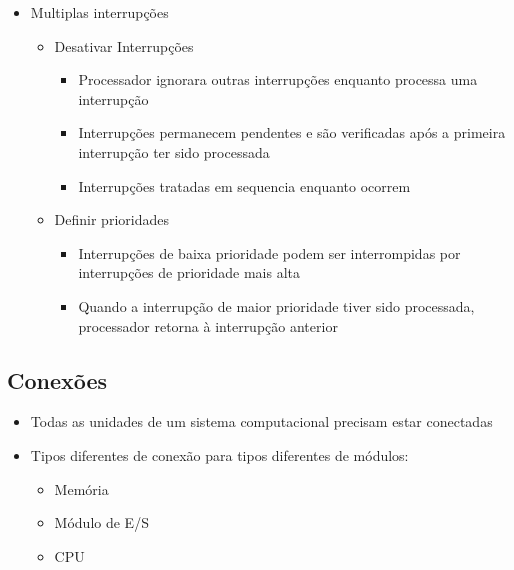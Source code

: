 \documentclass[12pt]{article}
\begin{document}
\begin{itemize}
\begin{itemize}
\begin{itemize}
                \end{itemize}
            \end{itemize}
            \item Multiplas interrupções
            \begin{itemize}
                \item Desativar Interrupções
                \begin{itemize}
                    \item Processador ignorara outras interrupções enquanto 
                    processa uma interrupção
                    \item Interrupções permanecem pendentes e são verificadas 
                    após a primeira interrupção ter sido processada
                    \item Interrupções tratadas em sequencia enquanto ocorrem
                \end{itemize}
                \item Definir prioridades
                \begin{itemize}
                    \item Interrupções de baixa prioridade podem ser 
                    interrompidas por interrupções de prioridade mais alta
                    \item Quando a interrupção de maior prioridade tiver sido 
                    processada, processador retorna à interrupção anterior
                \end{itemize}
            \end{itemize}
        \end{itemize}
    \subsection{Conexões}
    \begin{itemize}
        \item Todas as unidades de um sistema computacional precisam estar 
        conectadas
        \item Tipos diferentes de conexão para tipos diferentes de módulos:
        \begin{itemize}
            \item Memória
            \item Módulo de E/S
            \item CPU
        \end{itemize}
    \end{itemize}
\end{document}
